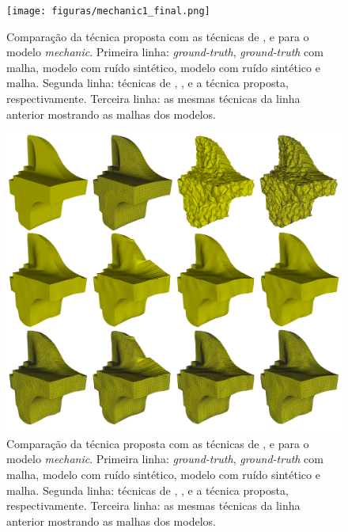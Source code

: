 \clearpage

\begin{figure}[p]
\captionsetup{width=\linewidth}
\centering
\texttt{[image: figuras/mechanic1\_final.png]}
\caption{Comparação da técnica proposta com as técnicas de \cite{zhang2015guided}, \cite{sun2007fast} e \cite{zheng2011bilateral} para o modelo \textit{mechanic}. Primeira linha: \textit{ground-truth}, \textit{ground-truth} com malha, modelo com ruído sintético, modelo com ruído sintético e malha. Segunda linha: técnicas de \cite{zhang2015guided}, \cite{sun2007fast}, \cite{zheng2011bilateral} e a técnica proposta, respectivamente. Terceira linha: as mesmas técnicas da linha anterior mostrando as malhas dos modelos.}
\label{fig:mechanic1_final}
\end{figure}

\begin{figure}[p]
\captionsetup{width=\linewidth}
\centering
\includegraphics[width=16cm]{figuras/mechanic2_final.png}
\caption{Comparação da técnica proposta com as técnicas de \cite{zhang2015guided}, \cite{sun2007fast} e \cite{zheng2011bilateral} para o modelo \textit{mechanic}. Primeira linha: \textit{ground-truth}, \textit{ground-truth} com malha, modelo com ruído sintético, modelo com ruído sintético e malha. Segunda linha: técnicas de \cite{zhang2015guided}, \cite{sun2007fast}, \cite{zheng2011bilateral} e a técnica proposta, respectivamente. Terceira linha: as mesmas técnicas da linha anterior mostrando as malhas dos modelos.}
\label{fig:mechanic2_final}
\end{figure}

